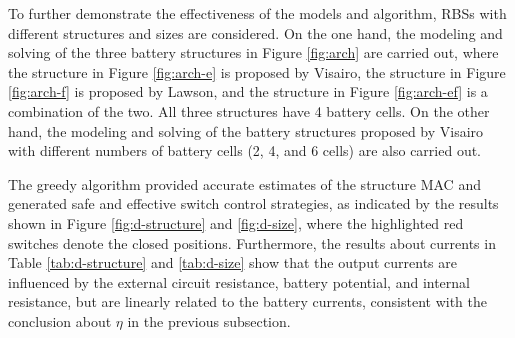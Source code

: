 \documentclass{article}
\begin{document}
To further demonstrate the effectiveness of the models and algorithm, RBSs with different structures and sizes are considered.
On the one hand, the modeling and solving of the three battery structures in Figure \ref{fig:arch} are carried out, where the structure in Figure \ref{fig:arch-e} is proposed by Visairo\cite{visairoReconfigurableBatteryPack2008}, the structure in Figure \ref{fig:arch-f} is proposed by Lawson\cite{lawsonSoftwareConfigurableBattery2012}, and the structure in Figure \ref{fig:arch-ef} is a combination of the two. All three structures have 4 battery cells.
On the other hand, the modeling and solving of the battery structures proposed by Visairo\cite{visairoReconfigurableBatteryPack2008} with different numbers of battery cells (2, 4, and 6 cells) are also carried out.

The greedy algorithm provided accurate estimates of the structure MAC and generated safe and effective switch control strategies, as indicated by the results shown in Figure \ref{fig:d-structure} and \ref{fig:d-size}, where the highlighted red switches denote the closed positions.
Furthermore, the results about currents in Table \ref{tab:d-structure} and \ref{tab:d-size} show that the output currents are influenced by the external circuit resistance, battery potential, and internal resistance, but are linearly related to the battery currents, consistent with the conclusion about $\eta$ in the previous subsection.
\end{document}
